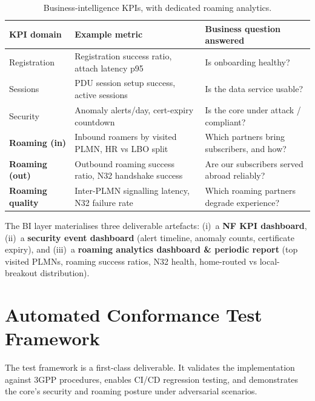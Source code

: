 \documentclass[11pt,a4paper]{report}
\begin{document}
\begin{table}[h]
\centering
\footnotesize
\renewcommand{\arraystretch}{1.25}
\begin{tabularx}{\linewidth}{@{}l l X@{}}
\toprule
\textbf{KPI domain} & \textbf{Example metric} & \textbf{Business question answered}\\
\midrule
Registration & Registration success ratio, attach latency p95 & Is onboarding healthy?\\
Sessions     & PDU session setup success, active sessions & Is the data service usable?\\
Security     & Anomaly alerts/day, cert-expiry countdown & Is the core under attack / compliant?\\
\textbf{Roaming (in)}  & Inbound roamers by visited PLMN, HR vs LBO split &
  Which partners bring subscribers, and how?\\
\textbf{Roaming (out)} & Outbound roaming success ratio, N32 handshake success &
  Are our subscribers served abroad reliably?\\
\textbf{Roaming quality} & Inter-PLMN signalling latency, N32 failure rate &
  Which roaming partners degrade experience?\\
\bottomrule
\end{tabularx}
\caption{Business-intelligence KPIs, with dedicated roaming analytics.}
\label{tab:bi}
\end{table}

The BI layer materialises three deliverable artefacts: (i)~a \textbf{NF KPI dashboard},
(ii)~a \textbf{security event dashboard} (alert timeline, anomaly counts, certificate
expiry), and (iii)~a \textbf{roaming analytics dashboard \& periodic report} (top visited
PLMNs, roaming success ratios, N32 health, home-routed vs local-breakout distribution).

\section{Automated Conformance Test Framework}
\label{sec:tests}
The test framework is a first-class deliverable. It validates the implementation against
3GPP procedures, enables CI/CD regression testing, and demonstrates the core's security
and roaming posture under adversarial scenarios.
\end{document}
